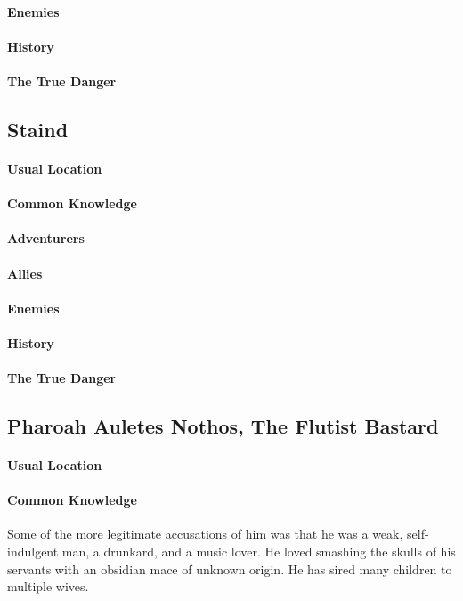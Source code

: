 \begin{multicols}{2}
    \paragraph{Enemies}
    \paragraph{History}
    \paragraph{The True Danger}
    
\subsection{Staind}
    \paragraph{Usual Location}
    \paragraph{Common Knowledge} 
    \paragraph{Adventurers}
    \paragraph{Allies}
    \paragraph{Enemies}
    \paragraph{History}
    \paragraph{The True Danger}
  
\subsection{Pharoah Auletes Nothos, The Flutist Bastard}
    \paragraph{Usual Location}
    \paragraph{Common Knowledge} Some of the more legitimate accusations of him was that he was a weak, self-indulgent man, a drunkard, and a music lover. He loved smashing the skulls of his servants with an obsidian mace of unknown origin. He has sired many children to multiple wives.

\end{multicols}
